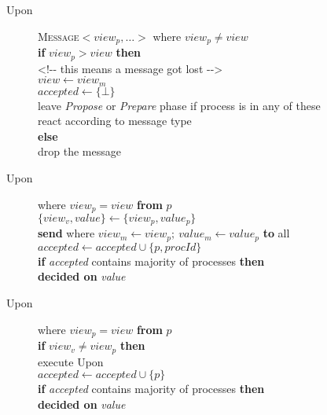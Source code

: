 \begin{table}
\begin{description}
 \item[Upon] \textsc{Message$<\textit{view}_p, \ldots>$} where $\textit{view}_p \neq \textit{view}$ \\
   \textbf{if} $\textit{view}_p > \textit{view}$ \textbf{then} \\
     \hspace*{\defaultParIndent} {\scriptsize \textless!-{}- this means a \prepare message got lost -{}-\textgreater }\\
     \hspace*{\defaultParIndent} $\textit{view} \leftarrow \textit{view}_m$ \\
     \hspace*{\defaultParIndent} $\textit{accepted} \leftarrow \{ \bot \} $ \\
     \hspace*{\defaultParIndent} leave \textsl{Propose} or \textsl{Prepare} phase if process is in any of these \\
     \hspace*{\defaultParIndent} react according to message type \\
   \textbf{else} \\
     \hspace*{\defaultParIndent} drop the message

 \item[Upon]  where $\textit{view}_p = \textit{view}$ \textbf{from} $p$ \\
   $\{\textit{view}_v, \textit{value}\} \leftarrow \{\textit{view}_p, \textit{value}_p\}$ \\
   \textbf{send}  where $\textit{view}_m \leftarrow \textit{view}_p;~\textit{value}_m \leftarrow \textit{value}_p$ \textbf{to} all\\
   $\textit{accepted} \leftarrow \textit{accepted} \cup \{ p, \textit{procId} \} $\\
   \textbf{if} \textit{accepted} contains majority of processes \textbf{then} \\
     \hspace*{\defaultParIndent} \textbf{decided on} \textit{value}

 \item[Upon]  where $\textit{view}_p = \textit{view}$ \textbf{from} $p$ \\
   \textbf{if} $\textit{view}_v \neq \textit{view}_p$ \textbf{then} \\
     \hspace*{\defaultParIndent} execute Upon  \\
   $\textit{accepted} \leftarrow \textit{accepted} \cup \{ p \} $ \\
   \textbf{if} \textit{accepted} contains majority of processes \textbf{then} \\
     \hspace*{\defaultParIndent} \textbf{decided on} \textit{value}


\end{description}
\end{table}
